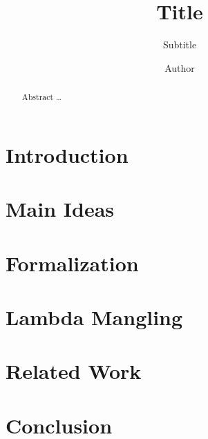 \documentclass[acmsmall,nonacm=true,screen=true,timestamp=true]{acmart}
\begin{document}
\title{Title}
\subtitle{Subtitle}
\author{Author}

\begin{abstract}
  Abstract \ldots
\end{abstract}

\maketitle



\section{Introduction}
\label{sec:intro}


\section{Main Ideas}
\label{sec:mainideas}


\section{Formalization}
\label{sec:formalization}


\section{Lambda Mangling}
\label{sec:lammangle}


\section{Related Work}
\label{sec:relatedwork}


\section{Conclusion}
\label{sec:conclusion}



\end{document}
